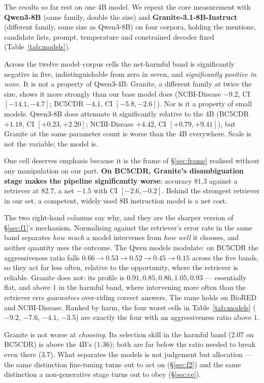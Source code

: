 \documentclass[11pt]{article}
\begin{document}
The results so far rest on one 4B model. We repeat the core measurement with
\textbf{Qwen3-8B} (same family, double the size) and \textbf{Granite-3.1-8B-Instruct}
(different family, same size as Qwen3-8B) on four corpora, holding the mentions,
candidate lists, prompt, temperature and constrained decoder fixed (Table~\ref{tab:models}).

Across the twelve model--corpus cells the net-harmful band is significantly negative in
five, indistinguishable from zero in seven, and \emph{significantly positive in none}.
It is not a property of Qwen3-4B: Granite, a different family at twice the size, shows
it more strongly than our base model does (NCBI-Disease $-9.2$, CI $[-14.1,-4.7]$;
BC5CDR $-4.1$, CI $[-5.8,-2.6]$). Nor is it a property of small models. Qwen3-8B does
attenuate it significantly relative to the 4B (BC5CDR $+1.18$, CI $[+0.23,+2.20]$;
NCBI-Disease $+4.42$, CI $[+0.79,+9.41]$), but Granite at the same parameter count is
worse than the 4B everywhere. Scale is not the variable; the model is.

One cell deserves emphasis because it is the frame of \S\ref{sec:frame} realised without
any manipulation on our part. \textbf{On BC5CDR, Granite's disambiguation stage makes
the pipeline significantly worse}: accuracy $81.3$ against a retriever at $82.7$, a net
$-1.5$ with CI $[-2.6,-0.2]$. Behind the strongest retriever in our set, a competent,
widely used 8B instruction model is a net cost.

The two right-hand columns say why, and they are the sharper version of \S\ref{sec:f1}'s
mechanism. Normalising against the retriever's error rate in the same band separates
\emph{how much} a model intervenes from \emph{how well} it chooses, and neither quantity
uses the outcome. The Qwen models modulate: on BC5CDR the aggressiveness ratio falls
$0.66 \to 0.53 \to 0.52 \to 0.45 \to 0.15$ across the five bands, so they act far less
often, relative to the opportunity, where the retriever is reliable. Granite does not:
its profile is $0.91, 0.85, 0.86, 1.05, 0.93$ --- essentially flat, and above $1$ in the
harmful band, where intervening more often than the retriever errs \emph{guarantees}
over-riding correct answers. The same holds on BioRED and NCBI-Disease. Ranked by harm,
the four worst cells in Table~\ref{tab:models} ($-9.2$, $-7.6$, $-4.1$, $-3.5$) are
exactly the four with an aggressiveness ratio above $1$.

Granite is not worse at \emph{choosing}. Its selection skill in the harmful band ($2.07$
on BC5CDR) is above the 4B's ($1.36$); both are far below the ratio needed to break even
there ($3.7$). What separates the models is not judgement but allocation --- the same
distinction fine-tuning turns out to act on (\S\ref{sec:f2}) and the same distinction a
non-generative stage turns out to obey (\S\ref{sec:ce}).
\end{document}
